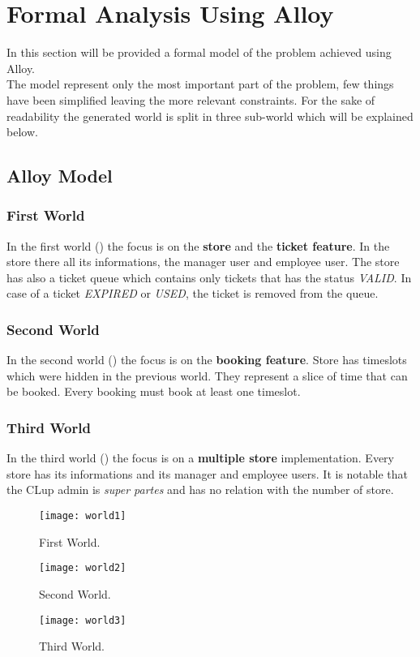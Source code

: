 \chapter{Formal Analysis Using Alloy}
In this section will be provided a formal model of the problem achieved using Alloy. \\
The model represent only the most important part of the problem, few things have been simplified leaving the more relevant constraints.
For the sake of readability the generated world is split in three sub-world which will be explained below.

\section{Alloy Model}


\subsection{First World}
In the first world () the focus is on the \textbf{store} and the \textbf{ticket feature}. In the store there all its informations,
the manager user and employee user. The store has also a ticket queue which contains only tickets that has the status \textit{VALID}.
In case of a ticket \textit{EXPIRED} or \textit{USED}, the ticket is removed from the queue.
\subsection{Second World}
In the second world () the focus is on the \textbf{booking feature}. Store has timeslots which were hidden in the previous world. They represent a slice of time that can be booked.
Every booking must book at least one timeslot.
\subsection{Third World}
In the third world () the focus is on a \textbf{multiple store} implementation. Every store has its informations and its manager and employee users. It is notable that the CLup admin
is \textit{super partes} and has no relation with the number of store.

\begin{figure}[H]
	\centering
	\texttt{[image: world1]}
	\caption{First World.}
	\label{fig:world1}
\end{figure}
\begin{figure}[H]
	\centering
	\texttt{[image: world2]}
	\caption{Second World.}
	\label{fig:world2}
\end{figure}
\begin{figure}[H]
	\centering
	\texttt{[image: world3]}
	\caption{Third World.}
	\label{fig:world3}
\end{figure}